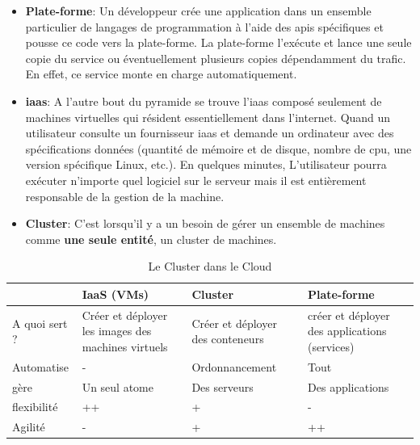 \begin{onehalfspace}
\begin{itemize}
	\item {} \textbf{Plate-forme}: Un développeur crée une application dans un ensemble particulier de langages de programmation à l'aide des \acrshort{api}s spécifiques et pousse ce code vers la plate-forme. La plate-forme l'exécute et lance une seule copie du service ou éventuellement plusieurs copies dépendamment du trafic. En effet, ce service monte en charge automatiquement. 
	\item {} \textbf{\acrshort{iaas}}: A l'autre bout du pyramide se trouve l'\acrshort{iaas} composé seulement de machines virtuelles qui résident essentiellement dans l'internet. Quand un utilisateur consulte un fournisseur \acrshort{iaas} et demande  un ordinateur avec des spécifications données (quantité de mémoire et de disque, nombre de \acrshort{cpu}, une version spécifique Linux, etc.). En quelques minutes, L'utilisateur pourra  exécuter n'importe quel logiciel sur le serveur mais il est entièrement responsable de la gestion de la machine.
	\item \textbf{Cluster}: C'est lorsqu'il y a un besoin de gérer un ensemble de machines comme \textbf{une seule entité}, un cluster de machines.

\end{itemize}


\def\arraystretch{1.6}%

{
\begin{center}
\begin{table}[H]

	\begin{tabu}{| X[c] | X[c] | X[c] | X[c] |} 


	\hline
	\textbf{} & \textbf{IaaS (VMs)} & \textbf{Cluster} & \textbf{Plate-forme}\\ [0.95ex] 
	\hline\hline
	A quoi sert ? 	& Créer et déployer les images des machines virtuels & Créer et déployer des conteneurs & créer et déployer des applications (services) \\ 
	Automatise					& - & Ordonnancement & Tout \\ 
	gère					& Un seul atome & Des serveurs & Des applications \\ 
	flexibilité					& ++ 	& + 	& - \\ 
	Agilité						& - 	& + 	& ++ \\ 
	\hline
	\end{tabu}
	\caption{Le Cluster dans le Cloud}
	\label{tab:table_label}


\end{table}
\end{center}}
\end{onehalfspace}
